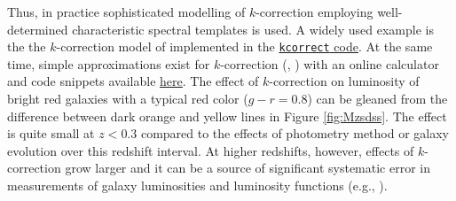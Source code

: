 Thus, in practice sophisticated modelling of $k$-correction employing well-determined characteristic spectral templates is used. A widely used example is the the $k$-correction model of \href{http://adsabs.harvard.edu/abs/2007AJ....133..734B}{\citet{blanton_roweis07}} implemented in the \href{http://cosmo.nyu.edu/mb144/kcorrect/v3_2-index.html}{{\tt kcorrect} code}.  At the same time, simple approximations exist for $k$-correction (\href{http://adsabs.harvard.edu/abs/2010MNRAS.405.1409C}{\citealt{chilingarian_etal10}}, \href{http://adsabs.harvard.edu/abs/2012MNRAS.419.1727C}{\citealt{chilingarian_zolotukhin12}}) with an online calculator and code snippets available \underline{\href{http://kcor.sai.msu.ru/}{here}}. The effect of $k$-correction on luminosity of bright red galaxies with a typical red color ($g-r=0.8$) can be gleaned from the difference between dark orange and yellow lines in Figure \ref{fig:Mzsdss}. The effect is quite small at $z<0.3$ compared to the effects of photometry method or galaxy evolution over this redshift interval. At higher redshifts, however, effects of $k$-correction grow larger and it can be a source of significant systematic error in measurements of galaxy luminosities and luminosity functions (e.g., \href{http://adsabs.harvard.edu/abs/2016arXiv160307299L}{\citealt{lake_wright16}}).

